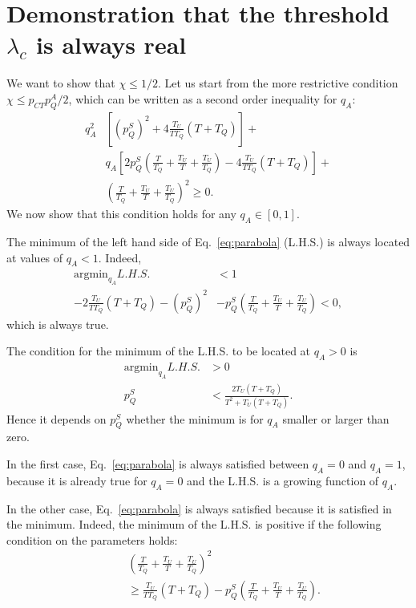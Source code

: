 \documentclass[aps,twocolumn,superscriptaddress,nofootinbib,pre,floatfix]{revtex4-1}
\begin{document}
\section{Demonstration that the threshold $\lambda_c$ is always real}
\label{lambdareal}
We want to show that $\chi \le 1/2$. Let us start from the
more restrictive condition $\chi \leq p_{CT}p_Q^A/2$, which can be written
as a second order inequality for $q_A$:
\begin{align}
    q_A^2 &\left[ (p_Q^S)^2 + 4 \frac{T_U}{T T_Q} (T+T_Q) \right] + \nonumber\\
    &q_A \left[ 2 p_Q^S \left(\frac{T}{T_Q} + \frac{T_U}{T} + \frac{T_U}{T_Q}\right) - 4 \frac{T_U}{T T_Q} (T + T_Q)\right] + \nonumber\\
    &\left(\frac{T}{T_Q} + \frac{T_U}{T} + \frac{T_U}{T_Q}\right)^2\geq 0.
    \label{eq:parabola}
\end{align}
We now show that this condition holds for any $q_A\in [0,1]$.

The minimum of the left hand side of Eq.~\eqref{eq:parabola} (L.H.S.)
is always located at values of $q_A < 1$. Indeed,
\begin{align}
    \text{argmin}_{q_A}L.H.S. &< 1 \nonumber\\ -2\frac{T_U}{T T_Q}
    (T+T_Q) - (p_Q^S)^2 &- p_Q^S(\frac{T}{T_Q} + \frac{T_U}{T} +
    \frac{T_U}{T_Q}) < 0,
\end{align}
which is always true.

The condition for the minimum of the L.H.S. to be located
at $q_A>0$ is
\begin{align}
\text{argmin}_{q_A}L.H.S. &>0 \nonumber\\
    p_Q^S &< \frac{2 T_U (T+T_Q)}{T^2 + T_U(T + T_Q)}.
    \label{eq:condition_qA_pos}
\end{align}
Hence it depends on $p_Q^S$ whether the minimum is for $q_A$ smaller
or larger than zero.

In the first case, Eq.~\eqref{eq:parabola} is always satisfied between
$q_A = 0$ and $q_A = 1$, because it is already true for $q_A=0$ and the
L.H.S. is a growing function of $q_A$.

In the other case, Eq.~\eqref{eq:parabola} is always satisfied because
it is satisfied in the minimum. Indeed, the minimum of the L.H.S.
is positive if the following condition on the parameters holds:
\begin{align}
    &\left(\frac{T}{T_Q} + \frac{T_U}{T} + \frac{T_U}{T_Q}\right)^2 \nonumber\\
    \quad \quad & \geq \frac{T_U}{T T_Q}(T+T_Q) - p_Q^S\left(\frac{T}{T_Q} + \frac{T_U}{T} + \frac{T_U}{T_Q}\right).
\end{align}
\end{document}
